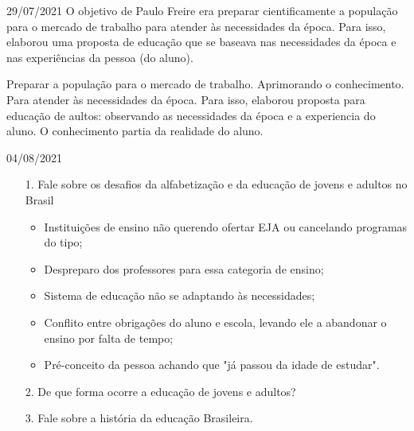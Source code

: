\documentclass{SchoolBook}
\begin{document}
    \begin{day}{29/07/2021}
        O objetivo de Paulo Freire era preparar cientificamente a população para o mercado de trabalho para atender às necessidades da época. Para isso, elaborou uma proposta de educação que se baseava nas necessidades da época e nas experiências da pessoa (do aluno).
    
        Preparar a população para o mercado de trabalho. Aprimorando o conhecimento. Para atender às necessidades da época. Para isso, elaborou proposta para educação de aultos: observando as necessidades da época e a experiencia do aluno. O conhecimento partia da realidade do aluno.
    \end{day}
    
    \begin{day}{04/08/2021}
        \begin{enumerate}
            \item[1.] Fale sobre os desafios da alfabetização e da educação de jovens e adultos no Brasil
            \response{}
            
            \begin{itemize}
                \item Instituições de ensino não querendo ofertar EJA ou cancelando programas do tipo;
                \item Despreparo dos professores para essa categoria de ensino;
                \item Sistema de educação não se adaptando às necessidades;
                \item Conflito entre obrigações do aluno e escola, levando ele a abandonar o ensino por falta de tempo;
                \item Pré-conceito da pessoa achando que "já passou da idade de estudar".
            \end{itemize}

            \item[2.] De que forma ocorre a educação de jovens e adultos?
                \response{}
                
            \item[3.] Fale sobre a história da educação Brasileira.
                \response{}
        \end{enumerate}
    \end{day}
\end{document}
